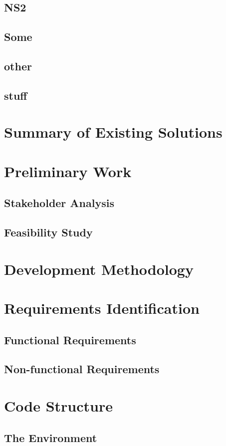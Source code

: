 \documentclass[12pt,a4paper,twoside]{report}
\begin{document}
		\subsection{NS2}
		\subsection{Some}
		\subsection{other}
		\subsection{stuff}
		\section{Summary of Existing Solutions}
	
	\section{Preliminary Work}
		\subsection{Stakeholder Analysis}
		\subsection{Feasibility Study}
	\section{Development Methodology}
	\section{Requirements Identification}
		\subsection{Functional Requirements}
		\subsection{Non-functional Requirements}
	\section{Code Structure}
		\subsection{The Environment}
\end{document}
